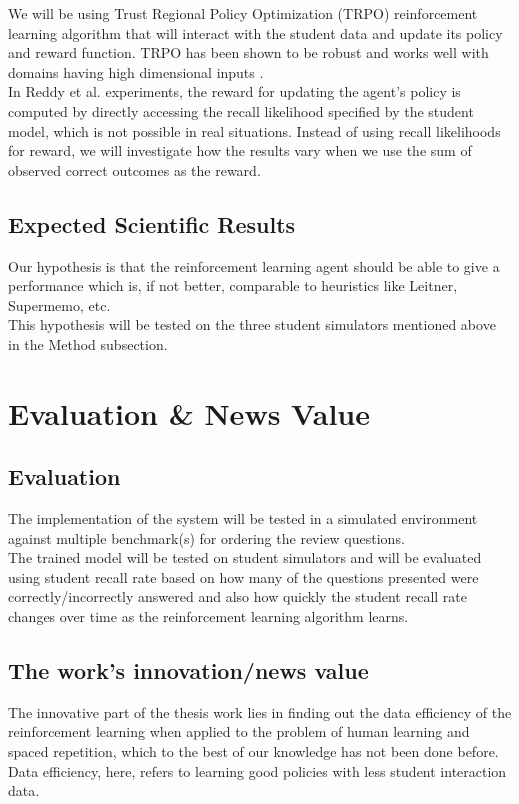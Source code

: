 \documentclass[12pt]{article}
\begin{document}
We will be using Trust Regional Policy Optimization (TRPO) reinforcement learning algorithm that will interact with the student data and update its policy and reward function. TRPO has been shown to be robust and works well with domains having high dimensional inputs {\color{blue}\cite{trpo, survey_rl}}.\\

In Reddy et al.\cite{reddy} experiments, the reward for updating the agent’s policy is computed by directly accessing the recall likelihood specified by the student model, which is not possible in real situations. Instead of using recall likelihoods for reward, we will investigate how the results vary when we use the sum of observed correct outcomes as the reward.


\subsection{Expected Scientific Results}
Our hypothesis is that the reinforcement learning agent should be able to give a performance which is, if not better, comparable to heuristics like Leitner, Supermemo, etc.\\
This hypothesis will be tested on the three student simulators mentioned above in the Method subsection.

\section{Evaluation \& News Value}
\subsection{Evaluation}
The implementation of the system will be tested in a simulated environment against multiple benchmark(s) for ordering the review questions.\\
The trained model will be tested on student simulators and will be evaluated using student recall rate based on {\color{blue}how many of the questions presented were correctly/incorrectly answered }and also how quickly the student recall rate changes over time as the reinforcement learning algorithm learns.\\

\subsection{The work's innovation/news value} 
The innovative part of the thesis work lies in finding out the data efficiency of the reinforcement learning when applied to the problem of human learning and spaced repetition, which to the best of our knowledge has not been done before. Data efficiency, here, refers to learning good policies with less student interaction data.
\end{document}
